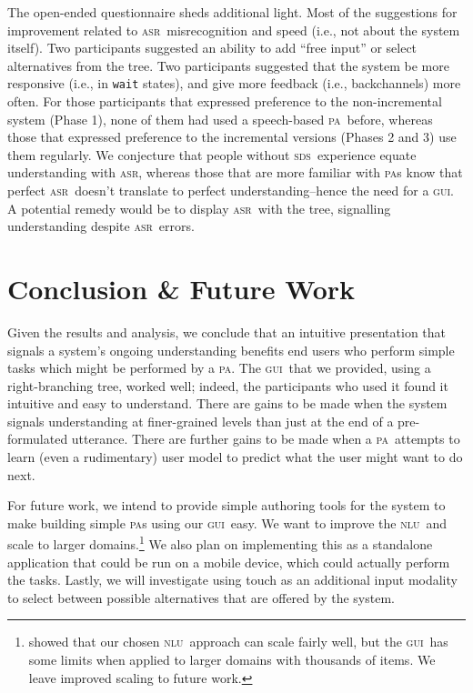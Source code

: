 \documentclass[11pt]{article}
\newcommand{\sds}[0]{\textsc{sds}}
\newcommand{\nlu}[0]{\textsc{nlu}}
\newcommand{\asr}[0]{\textsc{asr}}
\newcommand{\ui}[0]{\textsc{gui}}
\newcommand{\pa}[0]{\textsc{pa}}
\begin{document}
The open-ended questionnaire sheds additional light. Most of the suggestions for improvement related to \asr\ misrecognition and speed (i.e., not about the system itself). Two participants suggested an ability to add ``free input'' or select alternatives from the tree. Two participants suggested that the system be more responsive (i.e., in \texttt{wait} states), and give more feedback (i.e., backchannels) more often. For those participants that expressed preference to the non-incremental system (Phase 1), none of them had used a speech-based \pa\ before, whereas those that expressed preference to the incremental versions (Phases 2 and 3) use them regularly. We conjecture that people without \sds\ experience equate understanding with \asr, whereas those that are more familiar with \pa s know that perfect \asr\ doesn't translate to perfect understanding--hence the need for a \ui. A potential remedy would be to display \asr\ with the tree, signalling understanding despite \asr\ errors.

\section{Conclusion \& Future Work}

Given the results and analysis, we conclude that an intuitive presentation that signals a system's ongoing understanding benefits end users who perform simple tasks which might be performed by a \pa. The \ui\ that we provided, using a right-branching tree, worked well; indeed, the participants who used it found it intuitive and easy to understand. There are gains to be made when the system signals understanding at finer-grained levels than just at the end of a pre-formulated utterance. There are further gains to be made when a \pa\ attempts to learn (even a rudimentary) user model to predict what the user might want to do next. 

For future work, we intend to provide simple authoring tools for the system to make building simple \pa s using our \ui\ easy. We want to improve the \nlu\ and scale to larger domains.\footnote{ showed that our chosen \nlu\ approach can scale fairly well, but the \ui\ has some limits when applied to larger domains with thousands of items. We leave improved scaling to future work.} We also plan on implementing this as a standalone application that could be run on a mobile device, which could actually perform the tasks. Lastly, we  will investigate using touch as an additional input modality to select between possible alternatives that are offered by the system. 
\end{document}
